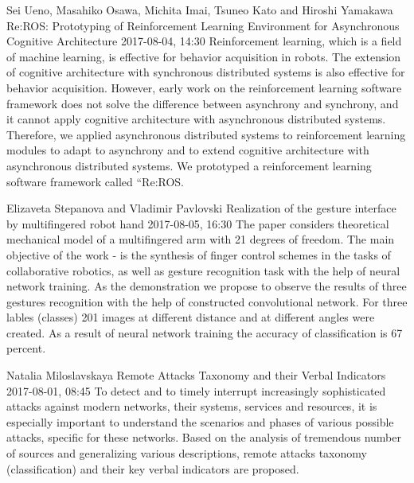 \documentclass[10pt,fleqn,openany]{book} %
\begin{document}
\begin{enumerate}
		
		\paperabstract
		{Sei Ueno, Masahiko Osawa, Michita Imai, Tsuneo Kato and Hiroshi Yamakawa}
		{Re:ROS: Prototyping of Reinforcement Learning Environment for Asynchronous Cognitive Architecture}
		{2017-08-04, 14:30}
		{Reinforcement learning, which is a field of machine learning, is effective for behavior acquisition in robots. The extension of cognitive architecture with synchronous distributed systems is also effective for behavior acquisition. However, early work on the reinforcement learning software framework does not solve the difference between asynchrony and synchrony, and it cannot apply cognitive architecture with asynchronous distributed systems. Therefore, we applied asynchronous distributed systems to reinforcement learning modules to adapt to asynchrony and to extend cognitive architecture with asynchronous distributed systems. We prototyped a reinforcement learning software framework called ``Re:ROS.}
		
		
		\paperabstract
		{Elizaveta Stepanova and Vladimir Pavlovski}
		{Realization of the gesture interface by multifingered robot hand}
		{2017-08-05, 16:30}
		{The paper considers theoretical mechanical model of a multifingered arm with 21 degrees of freedom. The main objective of the work - is the synthesis of finger control schemes in the tasks of collaborative robotics, as well as gesture recognition task with the help of neural network training. As the demonstration we propose to observe the results of three gestures recognition with the help of constructed convolutional network. For three lables (classes) 201 images at different distance and at different angles were created. As a result of neural network training the accuracy of classification is 67 percent.}
		
		
		\paperabstract
		{Natalia Miloslavskaya}
		{Remote Attacks Taxonomy and their Verbal Indicators}
		{2017-08-01, 08:45}
		{To detect and to timely interrupt increasingly sophisticated attacks against modern networks, their systems, services and resources, it is especially important to understand the scenarios and phases of various possible attacks, specific for these networks. Based on the analysis of tremendous number of sources and generalizing various descriptions, remote attacks taxonomy (classification) and their key verbal indicators are proposed.}
		

\end{enumerate}
\end{document}
